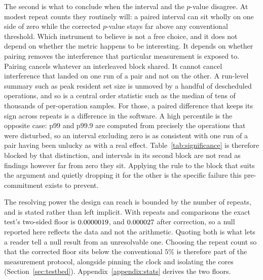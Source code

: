 \documentclass[english,oneside,a4paper,censored,csm,software-track-2020]{HYthesisML}
\begin{document}
The second is what to conclude when the interval and the $p$-value disagree. At modest repeat
counts they routinely will: a paired interval can sit wholly on one side of zero while the
corrected $p$-value stays far above any conventional threshold. Which instrument to believe
is not a free choice, and it does not depend on whether the metric happens to be interesting. It
depends on whether pairing removes the interference that particular measurement is exposed to.
Pairing cancels whatever an interleaved block shared. It cannot cancel interference that landed
on one run of a pair and not on the other. A run-level summary such as peak resident set size is
unmoved by a handful of descheduled operations, and so is a central order statistic such as the
median of tens of thousands of per-operation samples. For those, a paired difference that keeps
its sign across repeats is a difference in the software. A high percentile is the
opposite case: p99 and p99.9 are computed from precisely the operations that were disturbed, so
an interval excluding zero is as consistent with one run of a pair having been unlucky as with a
real effect. Table~\ref{tab:significance} is therefore blocked by that distinction, and
intervals in its second block are not read as findings however far from zero they sit. Applying
the rule to the block that suits the argument and quietly dropping it for the other is the
specific failure this pre-commitment exists to prevent.

The resolving power the design can reach is bounded by the number of repeats, and is stated
rather than left implicit. With \NRepeats{} repeats and \NTests{} comparisons the exact test's
two-sided floor is $0.0000019$, and $0.000027$ after correction, so a null reported
here reflects the data and not the arithmetic. Quoting both is what lets a reader tell a null
result from an unresolvable one. Choosing the repeat count so that the corrected floor sits below
the conventional $5\%$ is therefore part of the measurement protocol, alongside pinning the clock
and isolating the cores (Section~\ref{sec:testbed}). Appendix~\ref{appendix:stats} derives the two
floors.
\end{document}
